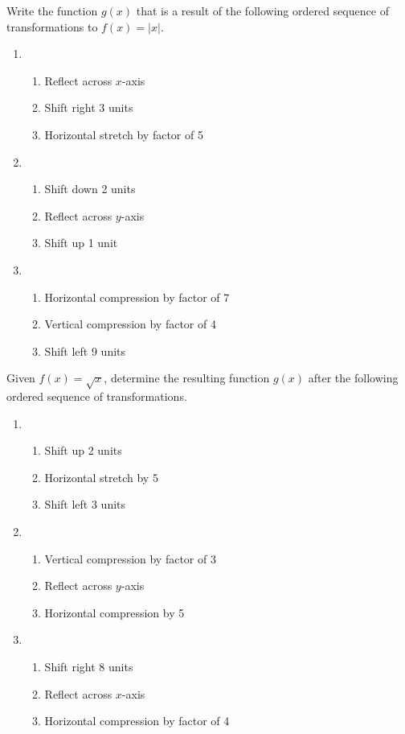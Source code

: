 Write the function $g(x)$ that is a result of the following ordered sequence of transformations to $f(x)=|x|$.
\begin{enumerate}
\setcounter{enumi}{\value{Review}}
\item
\begin{enumerate}[(1)]
\item Reflect across $x$-axis
\item Shift right 3 units
\item Horizontal stretch by factor of 5
\end{enumerate}

\item
\begin{enumerate}[(1)]
\item Shift down 2 units
\item Reflect across $y$-axis
\item Shift up 1 unit
\end{enumerate}

\item
\begin{enumerate}[(1)]
\item Horizontal compression by factor of 7
\item Vertical compression by factor of 4
\item Shift left 9 units
\end{enumerate}
\setcounter{Review}{\value{enumi}}
\end{enumerate}

Given $f(x) = \sqrt{x}$, determine the resulting function $g(x)$ after the following ordered sequence of transformations.
\begin{enumerate}
\setcounter{enumi}{\value{Review}}
\item
\begin{enumerate}[(1)]
\item Shift up 2 units
\item Horizontal stretch by 5
\item Shift left 3 units
\end{enumerate}

\item
\begin{enumerate}[(1)]
\item Vertical compression by factor of 3
\item Reflect across $y$-axis
\item Horizontal compression by 5
\end{enumerate}

\item
\begin{enumerate}[(1)]
\item Shift right 8 units
\item Reflect across $x$-axis
\item Horizontal compression by factor of 4
\end{enumerate}
\setcounter{Review}{\value{enumi}}
\end{enumerate}

